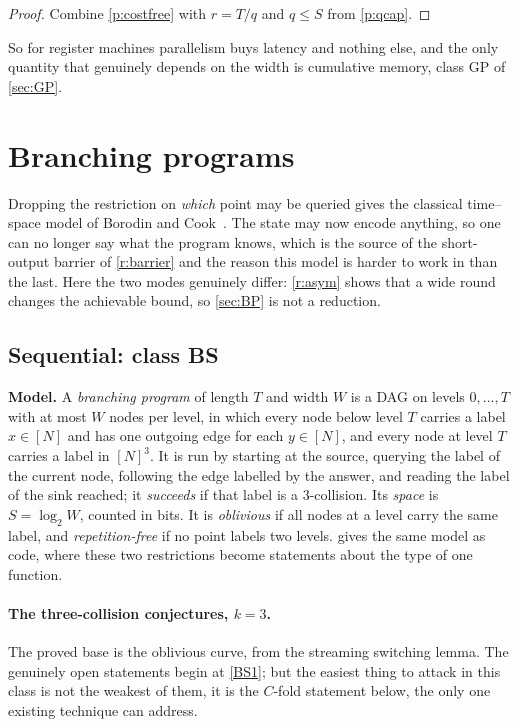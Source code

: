 \documentclass[11pt]{article}
\theoremstyle{plain}
\theoremstyle{definition}
\newcommand{\NN}{[N]}
\newcommand{\cls}[1]{\textsf{#1}}   %
\begin{document}
\begin{proof}
Combine \cref{p:costfree} with $r=T/q$ and $q \leq S$ from \cref{p:qcap}.
\end{proof}

So for register machines parallelism buys latency and nothing else, and the
only quantity that genuinely depends on the width is cumulative memory,
class \cls{GP} of \cref{sec:GP}.

\section{Branching programs}\label{sec:B}

Dropping the restriction on \emph{which} point may be queried gives the
classical time--space model of Borodin and Cook~\cite{BC82}.  The state may
now encode anything, so one can no longer say what the program knows, which
is the source of the short-output barrier of \cref{r:barrier} and the reason
this model is harder to work in than the last.  Here the two modes genuinely
differ: \cref{r:asym} shows that a wide round changes the achievable bound,
so \cref{sec:BP} is not a reduction.

\subsection{Sequential: class \cls{BS}}\label{sec:bp}

\begin{cbox}
\textbf{Model.}  A \emph{branching program} of length $T$ and width $W$ is
a DAG on levels $0,\dots,T$ with at most $W$ nodes per level, in which
every node below level $T$ carries a label $x \in \NN$ and has one
outgoing edge for each $y \in \NN$, and every node at level $T$ carries a
label in $\NN^{3}$.  It is run by starting at the source, querying the
label of the current node, following the edge labelled by the answer, and
reading the label of the sink reached; it \emph{succeeds} if that label is
a $3$-collision.  Its \emph{space} is $S = \log_2 W$, counted in bits.  It
is \emph{oblivious} if all nodes at a level carry the same label, and
\emph{repetition-free} if no point labels two levels.  
gives the same model as code, where these two restrictions become
statements about the type of one function.
\end{cbox}

\paragraph{The three-collision conjectures, $k=3$.}
The proved base is the oblivious curve, from the streaming switching lemma.
The genuinely open statements begin at \cref{BS1}; but the easiest thing to
attack in this class is not the weakest of them, it is the $C$-fold
statement below, the only one existing technique can address.
\end{document}
